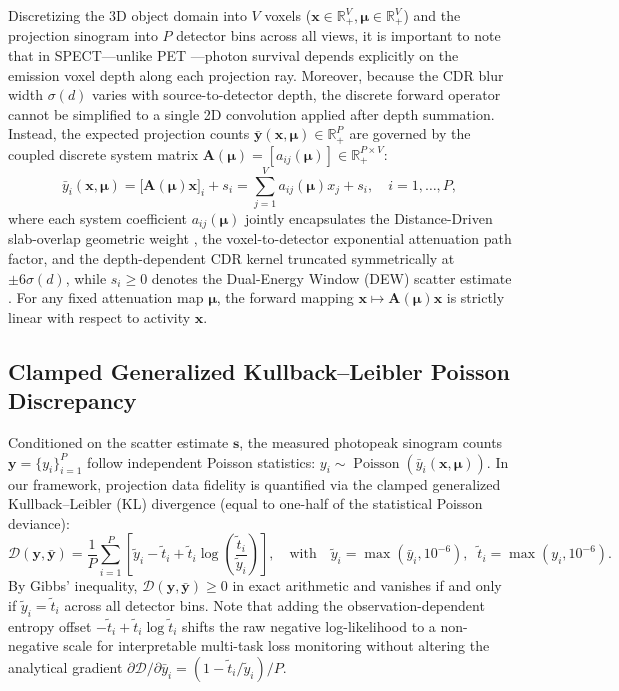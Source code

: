 \documentclass[11pt, a4paper]{article}
\begin{document}
Discretizing the 3D object domain into $V$ voxels ($\mathbf{x} \in \mathbb{R}_+^V, \boldsymbol{\mu} \in \mathbb{R}_+^V$) and the projection sinogram into $P$ detector bins across all views, it is important to note that in SPECT---unlike PET \cite{ref12, ref13}---photon survival depends explicitly on the emission voxel depth along each projection ray. Moreover, because the CDR blur width $\sigma(d)$ varies with source-to-detector depth, the discrete forward operator cannot be simplified to a single 2D convolution applied after depth summation. Instead, the expected projection counts $\bar{\mathbf{y}}(\mathbf{x}, \boldsymbol{\mu}) \in \mathbb{R}_+^P$ are governed by the coupled discrete system matrix $\mathbf{A}(\boldsymbol{\mu}) = [a_{ij}(\boldsymbol{\mu})] \in \mathbb{R}_+^{P \times V}$:
\begin{equation}
\bar{y}_i(\mathbf{x}, \boldsymbol{\mu}) = \big[\mathbf{A}(\boldsymbol{\mu})\mathbf{x}\big]_i + s_i = \sum_{j=1}^{V} a_{ij}(\boldsymbol{\mu}) x_j + s_i, \quad i = 1, \dots, P,
\end{equation}
where each system coefficient $a_{ij}(\boldsymbol{\mu})$ jointly encapsulates the Distance-Driven slab-overlap geometric weight \cite{ref36, ref37}, the voxel-to-detector exponential attenuation path factor, and the depth-dependent CDR kernel truncated symmetrically at $\pm 6\sigma(d)$, while $s_i \ge 0$ denotes the Dual-Energy Window (DEW) scatter estimate \cite{ref31, ref32}. For any fixed attenuation map $\boldsymbol{\mu}$, the forward mapping $\mathbf{x} \mapsto \mathbf{A}(\boldsymbol{\mu})\mathbf{x}$ is strictly linear with respect to activity $\mathbf{x}$.

\subsection{Clamped Generalized Kullback--Leibler Poisson Discrepancy}
Conditioned on the scatter estimate $\mathbf{s}$, the measured photopeak sinogram counts $\mathbf{y} = \{y_i\}_{i=1}^P$ follow independent Poisson statistics: $y_i \sim \operatorname{Poisson}(\bar{y}_i(\mathbf{x}, \boldsymbol{\mu}))$. In our framework, projection data fidelity is quantified via the clamped generalized Kullback--Leibler (KL) divergence (equal to one-half of the statistical Poisson deviance):
\begin{equation}
\mathcal{D}(\mathbf{y}, \bar{\mathbf{y}}) = \frac{1}{P} \sum_{i=1}^{P} \left[ \widetilde{y}_i - \widetilde{t}_i + \widetilde{t}_i \log\left( \frac{\widetilde{t}_i}{\widetilde{y}_i} \right) \right], \quad \text{with} \quad \widetilde{y}_i = \max(\bar{y}_i, 10^{-6}), \;\; \widetilde{t}_i = \max(y_i, 10^{-6}).
\end{equation}
By Gibbs' inequality, $\mathcal{D}(\mathbf{y}, \bar{\mathbf{y}}) \ge 0$ in exact arithmetic and vanishes if and only if $\widetilde{y}_i = \widetilde{t}_i$ across all detector bins. Note that adding the observation-dependent entropy offset $-\widetilde{t}_i + \widetilde{t}_i \log \widetilde{t}_i$ shifts the raw negative log-likelihood to a non-negative scale for interpretable multi-task loss monitoring without altering the analytical gradient $\partial \mathcal{D} / \partial \bar{y}_i = (1 - \widetilde{t}_i / \widetilde{y}_i) / P$.
\end{document}
